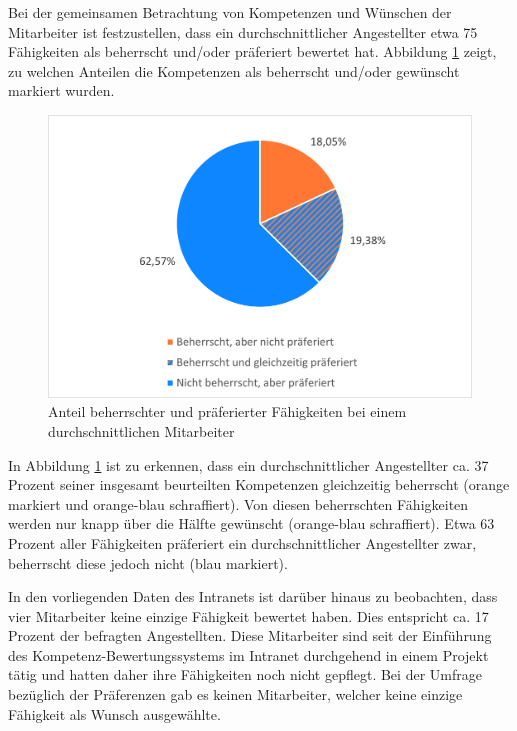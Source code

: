 Bei der gemeinsamen Betrachtung von Kompetenzen und Wünschen der Mitarbeiter ist festzustellen, dass ein durchschnittlicher Angestellter etwa 75 Fähigkeiten als beherrscht und/oder präferiert bewertet hat. Abbildung \ref{fig:ergebnisse:analyse:abb3} zeigt, zu welchen Anteilen die Kompetenzen als beherrscht und/oder gewünscht markiert wurden.

\begin{figure}[h]
	\centering
	\includegraphics[width=1\textwidth]{gfx/auswertung-anteil-an-faehigkeiten.png}
	\caption{Anteil beherrschter und präferierter Fähigkeiten bei einem durchschnittlichen Mitarbeiter}
	\label{fig:ergebnisse:analyse:abb3}
\end{figure}

In Abbildung \ref{fig:ergebnisse:analyse:abb3} ist zu erkennen, dass ein durchschnittlicher Angestellter ca. 37 Prozent seiner insgesamt beurteilten Kompetenzen gleichzeitig beherrscht (orange markiert und orange-blau schraffiert). Von diesen beherrschten Fähigkeiten werden nur knapp über die Hälfte gewünscht (orange-blau schraffiert). Etwa 63 Prozent aller Fähigkeiten präferiert ein durchschnittlicher Angestellter zwar, beherrscht diese jedoch nicht (blau markiert).

In den vorliegenden Daten des Intranets ist darüber hinaus zu beobachten, dass vier Mitarbeiter keine einzige Fähigkeit bewertet haben. Dies entspricht ca. 17 Prozent der befragten Angestellten. Diese Mitarbeiter sind seit der Einführung des Kompetenz-Bewertungssystems im Intranet durchgehend in einem Projekt tätig und hatten daher ihre Fähigkeiten noch nicht gepflegt. Bei der Umfrage bezüglich der Präferenzen gab es keinen Mitarbeiter, welcher keine einzige Fähigkeit als Wunsch ausgewählte.
\newpage
